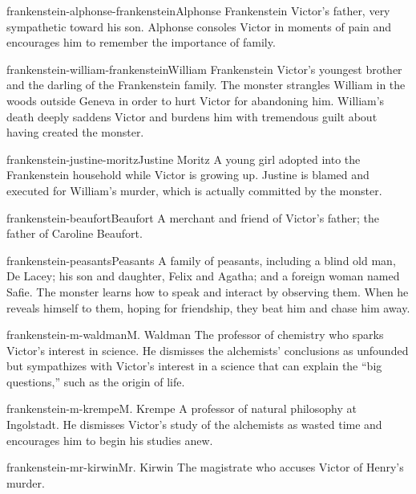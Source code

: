 \documentclass[preview]{standalone}
\begin{document}
\begin{snippetcharacter}{frankenstein-alphonse-frankenstein}{Alphonse Frankenstein}
    Victor's father, very sympathetic toward his son. Alphonse consoles Victor in moments of pain and encourages him to remember the importance of family.
\end{snippetcharacter}

\begin{snippetcharacter}{frankenstein-william-frankenstein}{William Frankenstein}
    Victor's youngest brother and the darling of the Frankenstein family. The monster strangles William in the woods outside Geneva in order to hurt Victor for abandoning him. William's death deeply saddens Victor and burdens him with tremendous guilt about having created the monster.
\end{snippetcharacter}

\begin{snippetcharacter}{frankenstein-justine-moritz}{Justine Moritz}
    A young girl adopted into the Frankenstein household while Victor is growing up. Justine is blamed and executed for William's murder, which is actually committed by the monster.
\end{snippetcharacter}

\begin{snippetcharacter}{frankenstein-beaufort}{Beaufort}
    A merchant and friend of Victor's father; the father of Caroline Beaufort.
\end{snippetcharacter}

\begin{snippetcharacter}{frankenstein-peasants}{Peasants}
    A family of peasants, including a blind old man, De Lacey; his son and daughter, Felix and Agatha; and a foreign woman named Safie. The monster learns how to speak and interact by observing them. When he reveals himself to them, hoping for friendship, they beat him and chase him away.
\end{snippetcharacter}

\begin{snippetcharacter}{frankenstein-m-waldman}{M. Waldman}
    The professor of chemistry who sparks Victor's interest in science. He dismisses the alchemists' conclusions as unfounded but sympathizes with Victor's interest in a science that can explain the “big questions,” such as the origin of life.
\end{snippetcharacter}

\begin{snippetcharacter}{frankenstein-m-krempe}{M. Krempe}
    A professor of natural philosophy at Ingolstadt. He dismisses Victor's study of the alchemists as wasted time and encourages him to begin his studies anew.
\end{snippetcharacter}

\begin{snippetcharacter}{frankenstein-mr-kirwin}{Mr. Kirwin}
    The magistrate who accuses Victor of Henry's murder.
\end{snippetcharacter}

\end{document}
